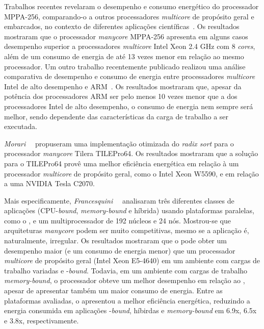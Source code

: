 Trabalhos recentes revelaram o desempenho e consumo energético do processador
MPPA-256, comparando-o a outros processadores \textit{multicore} de propósito
geral e embarcados, no contexto de diferentes aplicações
científicas~\cite{Castro-SBAC-PAD:2014,Castro-IA3:2013,Castro-IA3-JPDC:2014}. Os
resultados mostraram que o processador \emph{manycore} MPPA-256 apresenta em
alguns casos desempenho superior a processadores \emph{multicore} Intel Xeon 2.4
GHz com 8 \emph{cores}, além de um consumo de energia de até 13 vezes menor em
relação ao mesmo processador. Um outro trabalho recentemente publicado realizou
uma análise comparativa de desempenho e consumo de energia entre processadores
\emph{multicore} Intel de alto desempenho e ARM~\cite{Castro-Padoin-IET:2015}.
Os resultados mostraram que, apesar da potência dos processadores ARM ser pelo
menos 10 vezes menor que a dos processadores Intel de alto desempenho, o consumo
de energia nem sempre será melhor, sendo dependente das características da carga
de trabalho a ser executada.

\emph{Morari}~\etal~\cite{Valero:2012} propuseram uma implementação otimizada do
\textit{radix sort} para o processador \textit{manycore} Tilera TILEPro64. Os
resultados mostraram que a solução para o TILEPro64 provê uma melhor eficiência
energética em relação à um processador \textit{multicore} de propósito geral, como
o Intel Xeon W5590, e em relação a uma \gpu NVIDIA Tesla C2070.

Mais especificamente, \emph{Francesquini}~\etal~\cite{Castro-IA3-JPDC:2014} analisaram
três diferentes classes de aplicações (CPU-\textit{bound}, \textit{memory-bound}
e híbrida) usando plataformas paralelas, como o \mppa, e um multiprocessador \numa de
192 núcleos e 24 nós. Mostrou-se que arquiteturas \textit{manycore} podem ser muito
competitivas, mesmo se a aplicação é, naturalmente, irregular. Os resultados mostraram
que o \mppa pode obter um desempenho maior (e um consumo de energia menor) que um
processador \textit{multicore} de propósito geral (Intel Xeon E5-4640) em um ambiente
com cargas de trabalho variadas e \cpu{}-\textit{bound}. Todavia, em um ambiente com cargas
de trabalho \textit{memory-bound}, o processador \numa obteve um melhor desempenho
em relação ao \mppa, apesar de apresentar também um maior consumo de energia.
Entre as plataformas avaliadas, o \mppa apresentou a melhor eficiência
energética, reduzindo a energia consumida em aplicações \cpu{}-\textit{bound},
híbirdas e \textit{memory-bound} em 6.9x, 6.5x e 3.8x, respectivamente.

